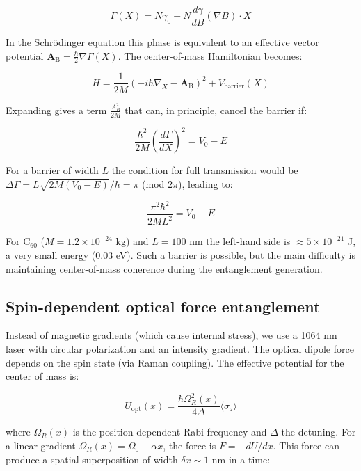 \documentclass[12pt,a4paper]{article}
\begin{document}
\begin{equation}
\Gamma(X) = N\gamma_0 + N\frac{d\gamma}{dB}(\nabla B)\cdot X
\end{equation}

In the Schr\"odinger equation this phase is equivalent to an effective vector potential $\mathbf{A}_{\text{B}} = \frac{\hbar}{2}\nabla\Gamma(X)$. The center-of-mass Hamiltonian becomes:

\begin{equation}
H = \frac{1}{2M}\left(-i\hbar\nabla_X - \mathbf{A}_{\text{B}}\right)^2 + V_{\text{barrier}}(X) \label{eq:hbarrier}
\end{equation}

Expanding gives a term $\frac{A_B^2}{2M}$ that can, in principle, cancel the barrier if:

\begin{equation}
\frac{\hbar^2}{2M}\left(\frac{d\Gamma}{dX}\right)^2 = V_0 - E \label{eq:cancel}
\end{equation}

For a barrier of width $L$ the condition for full transmission would be $\Delta\Gamma = L\sqrt{2M(V_0-E)}/\hbar = \pi$ (mod $2\pi$), leading to:

\begin{equation}
\frac{\pi^2\hbar^2}{2ML^2} = V_0 - E \label{eq:resonance}
\end{equation}

For C$_{60}$ ($M=1.2\times10^{-24}$ kg) and $L=100$ nm the left-hand side is $\approx5\times10^{-21}$ J, a very small energy (0.03 eV). Such a barrier is possible, but the main difficulty is maintaining center-of-mass coherence during the entanglement generation.

\subsection{Spin-dependent optical force entanglement}
Instead of magnetic gradients (which cause internal stress), we use a 1064 nm laser with circular polarization and an intensity gradient. The optical dipole force depends on the spin state (via Raman coupling). The effective potential for the center of mass is:

\begin{equation}
U_{\text{opt}}(x) = \frac{\hbar \Omega_R^2(x)}{4\Delta} \langle \sigma_z \rangle
\end{equation}

where $\Omega_R(x)$ is the position-dependent Rabi frequency and $\Delta$ the detuning. For a linear gradient $\Omega_R(x)=\Omega_0+\alpha x$, the force is $F=-dU/dx$. This force can produce a spatial superposition of width $\delta x\sim1$ nm in a time:
\end{document}
